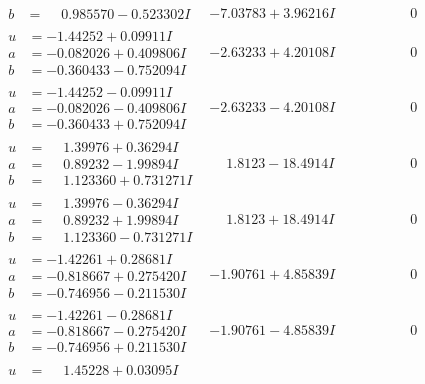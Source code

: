 \documentclass[1p]{elsarticle_modified}
\theoremstyle{definition}
\begin{document}
$$\begin{array}{c|c|c}
\begin{aligned}
b &= \phantom{-}0.985570 - 0.523302 I\end{aligned}
 & -7.03783 + 3.96216 I & \phantom{-0.000000 } 0 \\ \hline\begin{aligned}
u &= -1.44252 + 0.09911 I \\
a &= -0.082026 + 0.409806 I \\
b &= -0.360433 - 0.752094 I\end{aligned}
 & -2.63233 + 4.20108 I & \phantom{-0.000000 } 0 \\ \hline\begin{aligned}
u &= -1.44252 - 0.09911 I \\
a &= -0.082026 - 0.409806 I \\
b &= -0.360433 + 0.752094 I\end{aligned}
 & -2.63233 - 4.20108 I & \phantom{-0.000000 } 0 \\ \hline\begin{aligned}
u &= \phantom{-}1.39976 + 0.36294 I \\
a &= \phantom{-}0.89232 - 1.99894 I \\
b &= \phantom{-}1.123360 + 0.731271 I\end{aligned}
 & \phantom{-}1.8123 - 18.4914 I & \phantom{-0.000000 } 0 \\ \hline\begin{aligned}
u &= \phantom{-}1.39976 - 0.36294 I \\
a &= \phantom{-}0.89232 + 1.99894 I \\
b &= \phantom{-}1.123360 - 0.731271 I\end{aligned}
 & \phantom{-}1.8123 + 18.4914 I & \phantom{-0.000000 } 0 \\ \hline\begin{aligned}
u &= -1.42261 + 0.28681 I \\
a &= -0.818667 + 0.275420 I \\
b &= -0.746956 - 0.211530 I\end{aligned}
 & -1.90761 + 4.85839 I & \phantom{-0.000000 } 0 \\ \hline\begin{aligned}
u &= -1.42261 - 0.28681 I \\
a &= -0.818667 - 0.275420 I \\
b &= -0.746956 + 0.211530 I\end{aligned}
 & -1.90761 - 4.85839 I & \phantom{-0.000000 } 0 \\ \hline\begin{aligned}
u &= \phantom{-}1.45228 + 0.03095 I \\

\end{aligned}
\end{array}$$
\end{document}
